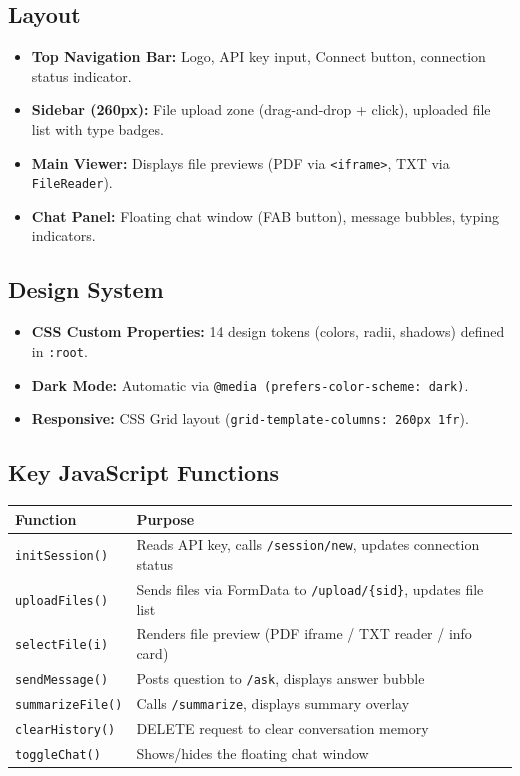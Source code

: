 \documentclass[12pt,a4paper]{article}
\begin{document}
\subsection{Layout}
\begin{itemize}
  \item \textbf{Top Navigation Bar:} Logo, API key input, Connect button, connection status indicator.
  \item \textbf{Sidebar (260px):} File upload zone (drag-and-drop + click), uploaded file list with type badges.
  \item \textbf{Main Viewer:} Displays file previews (PDF via \texttt{<iframe>}, TXT via \texttt{FileReader}).
  \item \textbf{Chat Panel:} Floating chat window (FAB button), message bubbles, typing indicators.
\end{itemize}

\subsection{Design System}
\begin{itemize}
  \item \textbf{CSS Custom Properties:} 14 design tokens (colors, radii, shadows) defined in \texttt{:root}.
  \item \textbf{Dark Mode:} Automatic via \texttt{@media (prefers-color-scheme: dark)}.
  \item \textbf{Responsive:} CSS Grid layout (\texttt{grid-template-columns: 260px 1fr}).
\end{itemize}

\subsection{Key JavaScript Functions}

\begin{longtable}{@{}p{4cm}p{9.5cm}@{}}
\toprule
\textbf{Function} & \textbf{Purpose} \\
\midrule
\endhead
\texttt{initSession()} & Reads API key, calls \texttt{/session/new}, updates connection status \\
\texttt{uploadFiles()} & Sends files via FormData to \texttt{/upload/\{sid\}}, updates file list \\
\texttt{selectFile(i)} & Renders file preview (PDF iframe / TXT reader / info card) \\
\texttt{sendMessage()} & Posts question to \texttt{/ask}, displays answer bubble \\
\texttt{summarizeFile()} & Calls \texttt{/summarize}, displays summary overlay \\
\texttt{clearHistory()} & DELETE request to clear conversation memory \\
\texttt{toggleChat()} & Shows/hides the floating chat window \\
\bottomrule
\end{longtable}
\end{document}

